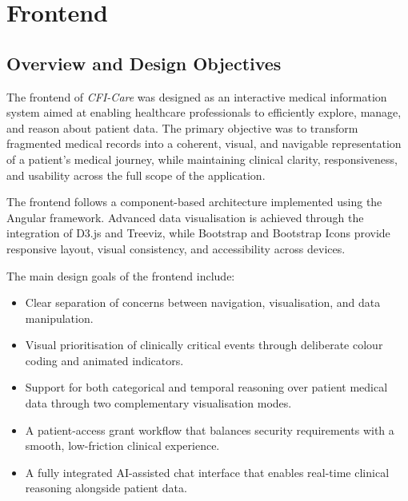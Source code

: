 
\section{Frontend}\label{chap:Frontend}

\subsection{Overview and Design Objectives}

The frontend of \textit{CFI-Care} was designed as an interactive medical
information system aimed at enabling healthcare professionals to efficiently
explore, manage, and reason about patient data. The primary objective was to
transform fragmented medical records into a coherent, visual, and navigable
representation of a patient's medical journey, while maintaining clinical
clarity, responsiveness, and usability across the full scope of the
application.

The frontend follows a component-based architecture implemented using the
Angular framework. Advanced data visualisation is achieved through the
integration of D3.js and Treeviz, while Bootstrap and Bootstrap Icons provide
responsive layout, visual consistency, and accessibility across devices.

The main design goals of the frontend include:
\begin{itemize}
    \item Clear separation of concerns between navigation, visualisation, and
          data manipulation.
    \item Visual prioritisation of clinically critical events through
          deliberate colour coding and animated indicators.
    \item Support for both categorical and temporal reasoning over patient
          medical data through two complementary visualisation modes.
    \item A patient-access grant workflow that balances security requirements
          with a smooth, low-friction clinical experience.
    \item A fully integrated AI-assisted chat interface that enables
          real-time clinical reasoning alongside patient data.
\end{itemize}

